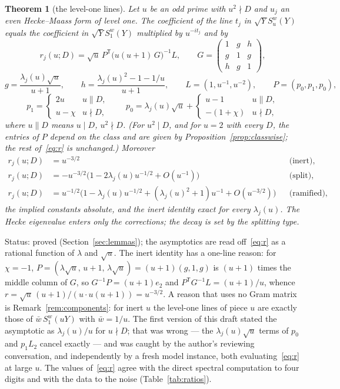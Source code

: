 \documentclass[11pt,a4paper]{article}
\newtheorem{theorem}{Theorem}
\theoremstyle{remark}\newtheorem{remark}[theorem]{Remark}
\newcommand{\status}[1]{\textcolor{blue!50!black}{\small\sffamily Status: #1}}
\begin{document}
\begin{theorem}[the level-one lines]\label{thm:level1}
Let $u$ be an odd prime with $u^2\nmid D$ and $u_j$ an even Hecke--Maass form of level one. The coefficient of the line $t_j$ in
$\sqrt Y S^w_u(Y)$ equals the coefficient in $\sqrt YS^w_1(Y)$ multiplied by $u^{-it_j}$ and by
\begin{equation}\label{eq:r}
r_j(u;D)=\sqrt u\,P^{\mathsf T}\bigl(u(u+1)\,G\bigr)^{-1}L,\qquad
G=\begin{pmatrix}1&g&h\\ g&1&g\\ h&g&1\end{pmatrix},
\end{equation}
\[
g=\frac{\lambda_j(u)\sqrt u}{u+1},\qquad h=\frac{\lambda_j(u)^2-1-1/u}{u+1},\qquad L=(1,u^{-1},u^{-2}),\qquad P=(p_0,p_1,p_0),
\]
\[
p_1=\begin{cases}2u&u\parallel D,\\ u-\chi&u\nmid D,\end{cases}\qquad
p_0=\lambda_j(u)\sqrt u+\begin{cases}u-1&u\parallel D,\\ -(1+\chi)&u\nmid D,\end{cases}
\]
where $u\parallel D$ means $u\mid D$, $u^2\nmid D$. (For $u^2\mid D$, and for $u=2$ with every $D$, the entries of $P$ depend on the
class and are given by Proposition~\ref{prop:classwise}; the rest of~\eqref{eq:r} is unchanged.)
Moreover
\[
\begin{aligned}
r_j(u;D)&=u^{-3/2}&&\text{(inert),}\\
r_j(u;D)&=-u^{-3/2}\bigl(1-2\lambda_j(u)u^{-1/2}+O(u^{-1})\bigr)&&\text{(split),}\\
r_j(u;D)&=u^{-1/2}\bigl(1-\lambda_j(u)u^{-1/2}+(\lambda_j(u)^2+1)u^{-1}+O(u^{-3/2})\bigr)&&\text{(ramified),}
\end{aligned}
\]
the implied constants absolute, and the inert identity exact for every $\lambda_j(u)$. The Hecke eigenvalue enters only the corrections; the decay is set by the splitting type.
\end{theorem}
\status{proved (Section~\ref{sec:lemmas}); the asymptotics are read off~\eqref{eq:r} as a rational function of $\lambda$ and $\sqrt u$.
The inert identity has a one-line reason: for $\chi=-1$, $P=(\lambda\sqrt u,\,u+1,\,\lambda\sqrt u)=(u+1)(g,1,g)$ is $(u+1)$ times the
middle column of $G$, so $G^{-1}P=(u+1)e_2$ and $P^{\mathsf T}G^{-1}L=(u+1)/u$, whence $r=\sqrt u\,(u+1)/(u\cdot u(u+1))=u^{-3/2}$. A reason that uses no Gram matrix is Remark~\ref{rem:components}: for inert $u$ the
level-one lines of piece $u$ are exactly those of $\bar w\,S^w_1(uY)$ with $\bar w=1/u$. The first version of this draft stated the asymptotic as
$\lambda_j(u)/u$ for $u\nmid D$; that was wrong --- the $\lambda_j(u)\sqrt u$ terms of $p_0$ and $p_1L_2$ cancel exactly --- and was
caught by the author's reviewing conversation, and independently by a fresh model instance, both evaluating~\eqref{eq:r} at large $u$. The values of~\eqref{eq:r} agree with the direct
spectral computation to four digits and with the data to the noise (Table~\ref{tab:ratios}).}
\end{document}
